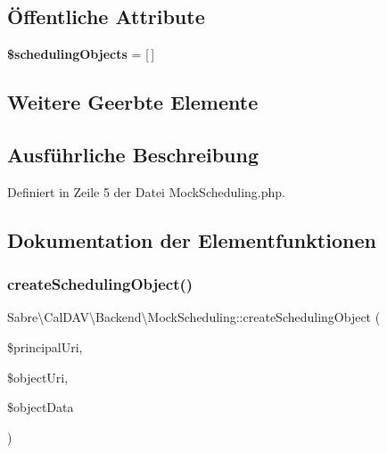 \subsection*{Öffentliche Attribute}
\begin{DoxyCompactItemize}
\item 
\mbox{\label{class_sabre_1_1_cal_d_a_v_1_1_backend_1_1_mock_scheduling_a0a0cc2b21f36bc381ff7c6216e646bb3}} 
{\bfseries \$scheduling\+Objects} = \mbox{[}$\,$\mbox{]}
\end{DoxyCompactItemize}
\subsection*{Weitere Geerbte Elemente}


\subsection{Ausführliche Beschreibung}


Definiert in Zeile 5 der Datei Mock\+Scheduling.\+php.



\subsection{Dokumentation der Elementfunktionen}
\mbox{\label{class_sabre_1_1_cal_d_a_v_1_1_backend_1_1_mock_scheduling_ab0482b3d3c97f9a40ebd73864fb6556d}} 
\subsubsection{\texorpdfstring{create\+Scheduling\+Object()}{createSchedulingObject()}}
{\footnotesize\ttfamily Sabre\textbackslash{}\+Cal\+D\+A\+V\textbackslash{}\+Backend\textbackslash{}\+Mock\+Scheduling\+::create\+Scheduling\+Object (\begin{DoxyParamCaption}\item[{}]{\$principal\+Uri,  }\item[{}]{\$object\+Uri,  }\item[{}]{\$object\+Data }\end{DoxyParamCaption})}

